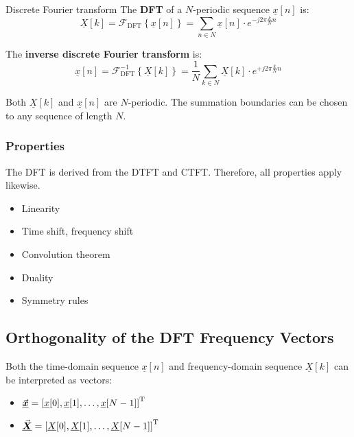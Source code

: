 \begin{refsection}
\begin{definition}{Discrete Fourier transform}
	The  \textbf{\acf{DFT}} of a $N$-periodic sequence $\underline{x}[n]$ is:
	\begin{equation}
		\underline{X}[k] = \mathcal{F}_{\text{DFT}}\left\{\underline{x}[n]\right\} = \sum\limits_{n \in N} \underline{x}[n] \cdot e^{-j 2\pi \frac{k}{N} n}
		\label{eq:ch04:dft}
	\end{equation}
	
	The  \textbf{inverse discrete Fourier transform} is:
	\begin{equation}
		\underline{x}[n] = \mathcal{F}_{\text{DFT}}^{-1}\left\{\underline{X}[k]\right\} = \frac{1}{N} \sum\limits_{k \in N} \underline{X}[k] \cdot e^{+ j 2\pi \frac{k}{N} n}
		\label{eq:ch04:idft}
	\end{equation}
	
	Both $\underline{X}[k]$ and $\underline{x}[n]$ are $N$-periodic. The summation boundaries can be chosen to any sequence of length $N$.
\end{definition}

\subsubsection{Properties}

The \ac{DFT} is derived from the \ac{DTFT} and \ac{CTFT}. Therefore, all properties apply likewise.
\begin{itemize}
	\item Linearity
	\item Time shift, frequency shift
	\item Convolution theorem
	\item Duality
	\item Symmetry rules
\end{itemize}

\subsection{Orthogonality of the \acs{DFT} Frequency Vectors}

Both the time-domain sequence $\underline{x}[n]$ and frequency-domain sequence $\underline{X}[k]$ can be interpreted as vectors:
\begin{itemize}
	\item $\vec{\bm{\underline{x}}} = \left[\underline{x}[0], \underline{x}[1], \dots, \underline{x}[N-1]\right]^{\mathrm{T}}$
	\item $\vec{\bm{\underline{X}}} = \left[\underline{X}[0], \underline{X}[1], \dots, \underline{X}[N-1]\right]^{\mathrm{T}}$
\end{itemize}


\end{refsection}
